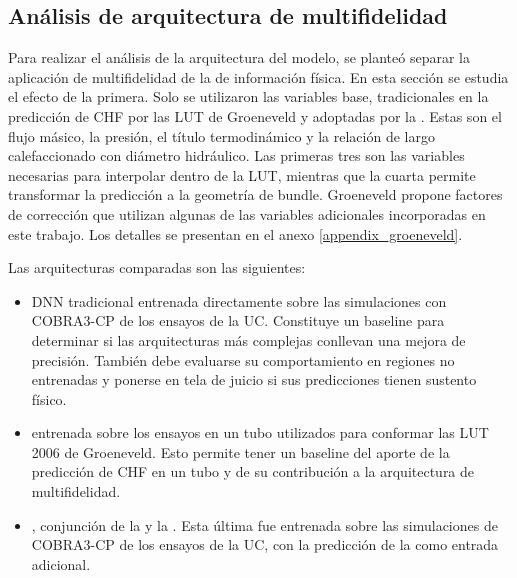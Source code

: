 \subsection{Análisis de arquitectura de multifidelidad}
\label{sec:chf_arq_mfdnn}
Para realizar el análisis de la arquitectura del modelo, se planteó separar la aplicación de multifidelidad de la de información física. En esta sección se estudia el efecto de la primera. Solo se utilizaron las variables base, tradicionales en la predicción de CHF por las LUT de Groeneveld y adoptadas por la \lfpinn{}.
Estas son el flujo másico, la presión, el título termodinámico y la relación de largo calefaccionado con diámetro hidráulico. Las primeras tres son las variables necesarias para interpolar dentro de la LUT, mientras que la cuarta permite transformar la predicción a la geometría de bundle. Groeneveld propone factores de corrección que utilizan algunas de las variables adicionales incorporadas en este trabajo. Los detalles se presentan en el anexo \ref{appendix_groeneveld}.

Las arquitecturas comparadas son las siguientes:
\begin{itemize}
    \item DNN tradicional entrenada directamente sobre las simulaciones con \break\mbox{COBRA3-CP} de los ensayos de la UC. Constituye un baseline para determinar si las arquitecturas más complejas conllevan una mejora de precisión. También debe evaluarse su comportamiento en regiones no entrenadas y ponerse en tela de juicio si sus predicciones tienen sustento físico.
    \item \lfpinn{} entrenada sobre los ensayos en un tubo utilizados para conformar las LUT 2006 de Groeneveld. Esto permite tener un baseline del aporte de la predicción de CHF en un tubo y de su contribución a la arquitectura de multifidelidad.
    \item \mfdnn{}, conjunción de la \lfpinn{} y la \hfdnn{}. Esta última fue entrenada sobre las simulaciones de COBRA3-CP de los ensayos de la UC, con la predicción de la \lfpinn{} como entrada adicional.
\end{itemize}

